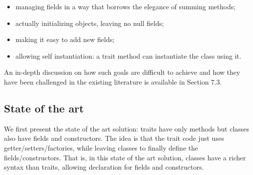 \begin{itemize}
\item managing fields in a way that borrows the elegance of summing methods;
\item actually initializing objects, leaving no null fields;
\item making it easy to add new fields;
\item allowing self instantiation: a trait method can instantiate the class using it.
\end{itemize}
An in-depth discussion on how such goals are 
difficult to achieve and how they have been challenged
in the existing literature is available in Section 7.3.


\subsection{State of the art}


We first present the state of the art solution: 
traits have only methods but classes also have fields and constructors.
The idea is that the trait code just uses getter/setters/factories, while leaving
classes to finally define the fields/constructors. That
is, in this state of the art solution, classes have a richer syntax than traits, allowing
declaration for fields and constructors. 

